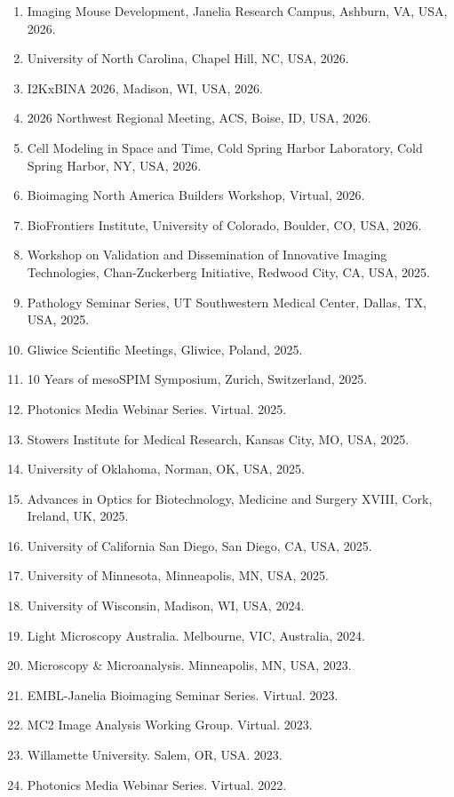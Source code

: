\begin{enumerate}
\item Imaging Mouse Development, Janelia Research Campus, Ashburn, VA, USA, 2026.
\item University of North Carolina, Chapel Hill, NC, USA, 2026.
\item I2KxBINA 2026, Madison, WI, USA, 2026.
\item 2026 Northwest Regional Meeting, ACS, Boise, ID, USA, 2026.
\item Cell Modeling in Space and Time, Cold Spring Harbor Laboratory, Cold Spring Harbor, NY, USA, 2026.
\item Bioimaging North America Builders Workshop, Virtual, 2026.
\item BioFrontiers Institute, University of Colorado, Boulder, CO, USA, 2026.
\item Workshop on Validation and Dissemination of Innovative Imaging Technologies, Chan-Zuckerberg Initiative, Redwood City, CA, USA, 2025.
\item Pathology Seminar Series, UT Southwestern Medical Center, Dallas, TX, USA, 2025.
\item Gliwice Scientific Meetings, Gliwice, Poland, 2025.
\item 10 Years of mesoSPIM Symposium, Zurich, Switzerland, 2025.
\item Photonics Media Webinar Series. Virtual. 2025.
\item Stowers Institute for Medical Research, Kansas City, MO, USA, 2025.
\item University of Oklahoma, Norman, OK, USA, 2025.
\item Advances in Optics for Biotechnology, Medicine and Surgery XVIII, Cork, Ireland, UK, 2025.
\item University of California San Diego, San Diego, CA, USA, 2025.
\item University of Minnesota, Minneapolis, MN, USA, 2025.
\item University of Wisconsin, Madison, WI, USA, 2024.
\item Light Microscopy Australia. Melbourne, VIC, Australia, 2024.
\item Microscopy \& Microanalysis. Minneapolis, MN, USA, 2023.
\item EMBL-Janelia Bioimaging Seminar Series. Virtual. 2023.
\item MC2 Image Analysis Working Group. Virtual. 2023.
\item Willamette University.  Salem, OR, USA. 2023.
\item Photonics Media Webinar Series.   Virtual. 2022.

\end{enumerate}
